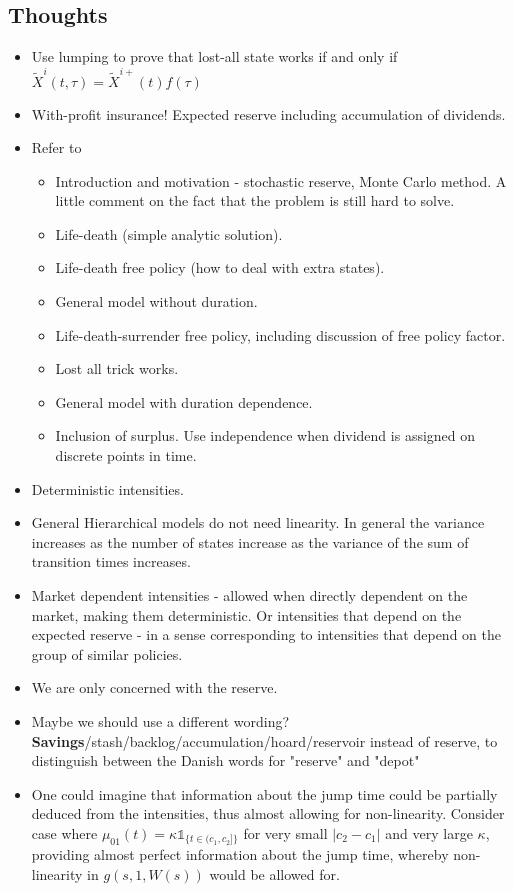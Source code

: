 \documentclass[12pt]{article}
\newcommand{\indic}[1]{\mathds{1}_{ \{ #1 \} }}
\theoremstyle{my_thm}
\begin{document}
\subsection{Thoughts}
\begin{itemize}
\item Use lumping to prove that lost-all state works if and only if $\tilde{X}^i(t,\tau) = \tilde{X}^{i+}(t)f(\tau)$
\item With-profit insurance! Expected reserve including accumulation of dividends.
\item Refer to \citet{Norberg}
\begin{itemize}
\item Introduction and motivation - stochastic reserve, Monte Carlo method. A little comment on the fact that the problem is still hard to solve.
\item Life-death (simple analytic solution).
\item Life-death free policy (how to deal with extra states).
\item General model without duration.
\item Life-death-surrender free policy, including discussion of free policy factor.
\item Lost all trick works.
\item General model with duration dependence.
\item Inclusion of surplus. Use independence when dividend is assigned on discrete points in time.
\end{itemize}
\item Deterministic intensities.
\item General Hierarchical models do not need linearity. In general the variance increases as the number of states increase as the variance of the sum of transition times increases.
\item Market dependent intensities - allowed when directly dependent on the market, making them deterministic. Or intensities that depend on the expected reserve - in a sense corresponding to intensities that depend on the group of similar policies.
\item We are only concerned with the reserve.
\item Maybe we should use a different wording? \textbf{Savings}/stash/backlog/accumulation/hoard/reservoir instead of reserve, to distinguish between the Danish words for "reserve" and "depot"
\item One could imagine that information about the jump time could be partially deduced from the intensities, thus almost allowing for non-linearity. Consider case where $\mu_{01}(t)= \kappa \indic{t \in (c_1,c_2]}$ for very small $|c_2-c_1|$ and very large $\kappa$, providing almost perfect information about the jump time, whereby non-linearity in $g(s,1,W(s))$ would be allowed for.

\end{itemize}
\end{document}
